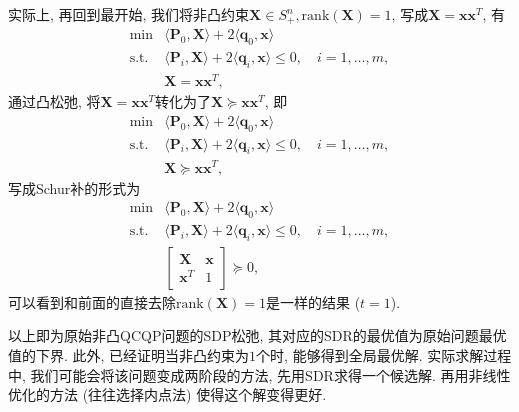 \documentclass[a4paper,12pt]{article}
\begin{document}
实际上, 再回到最开始, 我们将非凸约束$\bm{X} \in S^n_{+}, \text{rank}(\bm{X})=1$, 写成$\bm{X} = \bm{x}\bm{x}^T$, 有 
\begin{equation}
\begin{array}{cl}
{\min} & {\langle \bm{P}_0,\bm{X}\rangle + 2 \langle \bm{q}_0,\bm{x} \rangle} \\
{\text{s.t.}} & {\langle \bm{P}_i,\bm{X} \rangle + 2 \langle \bm{q}_i,\bm{x} \rangle \leq 0,\quad i=1,\dots,m}, \\
{} & {\bm{X} = \bm{x}\bm{x}^T},
\end{array}
\end{equation}
通过凸松弛, 将$\bm{X} = \bm{x}\bm{x}^T$转化为了$\bm{X} \succeq \bm{x}\bm{x}^T$, 即
\begin{equation}
\begin{array}{cl}
{\min} & {\langle \bm{P}_0,\bm{X}\rangle + 2 \langle \bm{q}_0,\bm{x} \rangle} \\
{\text{s.t.}} & {\langle \bm{P}_i,\bm{X} \rangle + 2 \langle \bm{q}_i,\bm{x} \rangle \leq 0,\quad i=1,\dots,m}, \\
{} & {\bm{X} \succeq \bm{x}\bm{x}^T},
\end{array}
\end{equation}
写成Schur补的形式为
\begin{equation}
\begin{array}{cl}
{\min} & {\langle \bm{P}_0,\bm{X}\rangle + 2 \langle \bm{q}_0,\bm{x} \rangle} \\
{\text{s.t.}} & {\langle \bm{P}_i,\bm{X} \rangle + 2 \langle \bm{q}_i,\bm{x} \rangle \leq 0,\quad i=1,\dots,m}, \\
{} & {{\begin{bmatrix} {\bm{X}} & {\bm{x}} \\ {\bm{x}^T} & 1 \end{bmatrix}} \succeq 0},
\end{array}
\end{equation}
可以看到和前面的直接去除$\text{rank}(\bm{X})=1$是一样的结果 ($t=1$).

以上即为原始非凸QCQP问题的SDP松弛, 其对应的SDR的最优值为原始问题最优值的下界. 
此外, 已经证明当非凸约束为$1$个时, 能够得到全局最优解. 
实际求解过程中, 我们可能会将该问题变成两阶段的方法, 先用SDR求得一个候选解.
再用非线性优化的方法 (往往选择内点法) 使得这个解变得更好.
\end{document}
